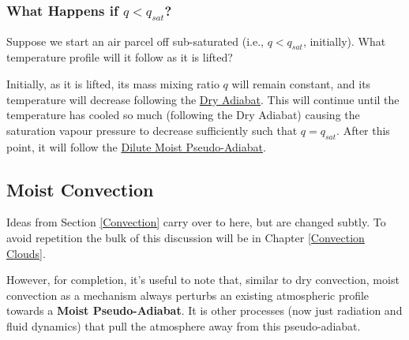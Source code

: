 \subsubsection{What Happens if $q<q_{sat}$?}

Suppose we start an air parcel off sub-saturated (i.e., $q<q_{sat}$, initially). What temperature profile will it follow as it is lifted? 

Initially, as it is lifted, its mass mixing ratio $q$ will remain constant, and its temperature will decrease following the \hyperref[Dry Adiabat]{Dry Adiabat}. This will continue until the temperature has cooled so much (following the Dry Adiabat) causing the saturation vapour pressure to decrease sufficiently such that $q=q_{sat}$. After this point, it will follow the \hyperref[dilute moist adiabat]{Dilute Moist Pseudo-Adiabat}.

\subsection{Moist Convection}

Ideas from Section \ref{Convection} carry over to here, but are changed subtly. To avoid repetition the bulk of this discussion will be in Chapter \ref{Convection Clouds}.

However, for completion, it's useful to note that, similar to dry convection, moist convection as a mechanism always perturbs an existing atmospheric profile towards a \textbf{Moist Pseudo-Adiabat}. It is other processes (now just radiation and fluid dynamics) that pull the atmosphere away from this pseudo-adiabat.